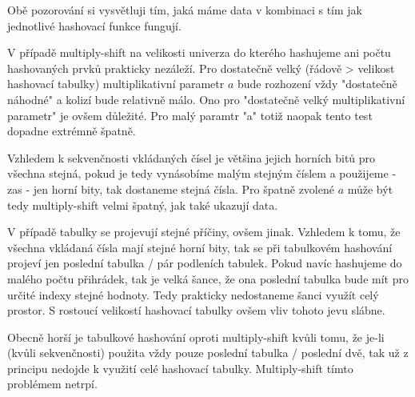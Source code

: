 \documentclass[12pt,a4paper]{report}
\begin{document}
	Obě pozorování si vysvětluji tím, jaká máme data v kombinaci s tím jak jednotlivé hashovací funkce fungují. 
	
	V případě multiply-shift na velikosti univerza do kterého hashujeme ani počtu hashovaných prvků prakticky nezáleží. Pro dostatečně velký (řádově > velikost hashovací tabulky) multiplikativní parametr $a$ bude rozhození vždy "dostatečně náhodné" a kolizí bude relativně málo. Ono pro "dostatečně velký multiplikativní parametr" je ovšem důležité. Pro malý paramtr "a" totiž naopak tento test dopadne extrémně špatně. 
	
	Vzhledem k sekvenčnosti vkládaných čísel je většina jejich horních bitů pro všechna stejná, pokud je tedy vynásobíme malým stejným číslem a použijeme - zas - jen horní bity, tak dostaneme stejná čísla. Pro špatně zvolené $a$ může být tedy multiply-shift velmi špatný, jak také ukazují data. 
	
	V případě tabulky se projevují stejné příčiny, ovšem jinak. Vzhledem k tomu, že všechna vkládaná čísla mají stejné horní bity, tak se při tabulkovém hashování projeví jen poslední tabulka / pár podleních tabulek. Pokud navíc hashujeme do malého počtu přihrádek, tak je velká šance, že ona poslední tabulka bude mít pro určité indexy stejné hodnoty. Tedy prakticky nedostaneme šanci využít celý prostor. S rostoucí velikostí hashovací tabulky ovšem vliv tohoto jevu slábne.
	
	Obecně horší je tabulkové hashování oproti multiply-shift kvůli tomu, že je-li (kvůli sekvenčnosti) použita vždy pouze poslední tabulka / poslední dvě, tak už z principu nedojde k využití celé hashovací tabulky. Multiply-shift tímto problémem netrpí. 
	
		
\end{document}
